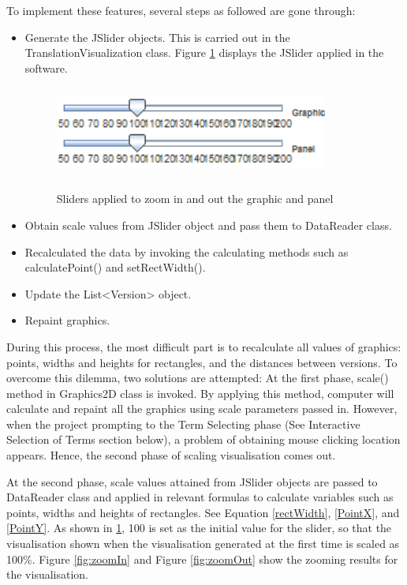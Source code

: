 To implement these features, several steps as followed are gone through:
\begin{itemize}
	\item \textbf{} Generate the JSlider objects. This is carried out in the TranslationVisualization class. Figure \ref{fig:jSliders} displays the JSlider applied in the software.
	\begin{figure}[H]
		\centering	
		\includegraphics[width=9cm, height=3cm]{Figs/JSliders}\\[1ex]
		\caption{ Sliders applied to zoom in and out the graphic and panel}
		\label{fig:jSliders}
	\end{figure} 	
	\item \textbf{} Obtain scale values from JSlider object and pass them to DataReader class.
	\item \textbf{} Recalculated the data by invoking the calculating methods such as calculatePoint() and setRectWidth().
	\item \textbf{} Update the List<Version> object.
	\item \textbf{} Repaint graphics.
\end{itemize} 
 
During this process, the most difficult part is to recalculate all values of graphics: points, widths and heights for rectangles, and the distances between versions. To overcome this dilemma, two solutions are attempted:
At the first phase, scale() method in Graphics2D class is invoked. By applying this method, computer will calculate and repaint all the graphics using scale parameters passed in. However, when the project prompting to the Term Selecting phase (See Interactive Selection of Terms section below), a problem of obtaining mouse clicking location appears. Hence, the second phase of scaling visualisation comes out.  

At the second phase, scale values attained from JSlider objects are passed to DataReader class and applied in relevant formulas to calculate variables such as points, widths and heights of rectangles. See Equation \eqref{rectWidth}, \eqref{PointX}, and \eqref{PointY}. As shown in \ref{fig:jSliders}, 100 is set as the initial value for the slider, so that the visualisation shown when the visualisation generated at the first time is scaled as 100\%. Figure \ref{fig:zoomIn} and Figure \ref{fig:zoomOut} show the zooming results for the visualisation.

